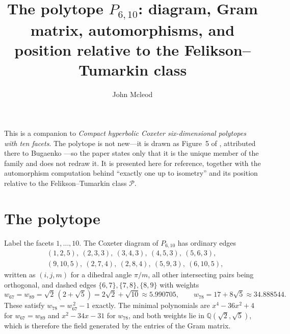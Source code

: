 \documentclass[11pt,reqno]{amsart}
\theoremstyle{plain}
\theoremstyle{definition}
\newcommand{\QQ}{\mathbb{Q}}
\newcommand{\PP}{P_{6,10}}
\begin{document}
\title{The polytope $\PP$: diagram, Gram matrix, automorphisms,
and position relative to the Felikson--Tumarkin class}
\author{John Mcleod}
\address{Solvo.ai}
\maketitle

\noindent
This is a companion to \emph{Compact hyperbolic Coxeter six-dimensional polytopes
with ten facets}. The polytope is not
new---it is drawn as Figure~5 of \cite{Burcroff2024}, attributed there to
Bugaenko \cite{Bugaenko1984}---so the paper states only that it is the unique
member of the family and does not redraw it. It is presented here for reference,
together with the automorphism computation behind ``exactly one up to
isometry'' and its position relative to the Felikson--Tumarkin class
$\mathcal{P}$.
\bigskip

\section{The polytope}
Label the facets $1,\dots,10$. The Coxeter diagram of $\PP$ has ordinary edges
\[
\begin{aligned}
&(1,2,5),\ (2,3,3),\ (3,4,3),\ (4,5,3),\ (5,6,3),\\
&(9,10,5),\ (2,7,4),\ (2,8,4),\ (5,9,3),\ (6,10,5),
\end{aligned}
\]
written as $(i,j,m)$ for a dihedral angle $\pi/m$, all other intersecting pairs
being orthogonal, and dashed edges $\{6,7\},\{7,8\},\{8,9\}$ with weights
\[
w_{67}=w_{89}=\sqrt2\,(2+\sqrt5)=2\sqrt2+\sqrt{10}\approx 5.990705,
\qquad
w_{78}=17+8\sqrt5\approx 34.888544 .
\]
These satisfy $w_{78}=w_{67}^{\,2}-1$ exactly. The minimal polynomials are
$x^4-36x^2+4$ for $w_{67}=w_{89}$ and $x^2-34x-31$ for $w_{78}$, and both
weights lie in $\QQ(\sqrt2,\sqrt5)$, which is therefore the field generated by
the entries of the Gram matrix.
\end{document}
